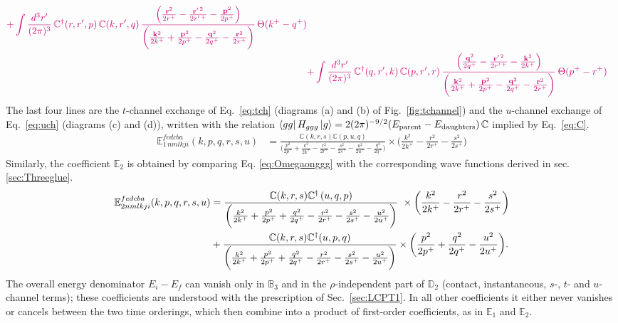 \documentclass[a4paper,11pt]{article}
\def\v#1{\mathbf{#1}}
\def\mf#1{\mathbb{#1}}
\begin{document}
\begin{align}
{\color{chg}+\int\frac{d^{3}r^{\prime}}{(2\pi)^{3}}\,\mf{C}^{\dagger}(r,r^{\prime},p)\,\mf{C}(k,r^{\prime},q)\,\frac{\left(\frac{\v{r}^{2}}{2r^{+}}-\frac{\v{r}^{\prime\,2}}{2r^{\prime\,+}}-\frac{\v{p}^{2}}{2p^{+}}\right)}{\bigg(\frac{\v{k}^{2}}{2k^{+}}+\frac{\v{p}^{2}}{2p^{+}}-\frac{\v{q}^{2}}{2q^{+}}-\frac{\v{r}^{2}}{2r^{+}}\bigg)}\,\Theta(k^{+}-q^{+})}\notag \\ & {\color{chg}+\int\frac{d^{3}r^{\prime}}{(2\pi)^{3}}\,\mf{C}^{\dagger}(q,r^{\prime},k)\,\mf{C}(p,r^{\prime},r)\,\frac{\left(\frac{\v{q}^{2}}{2q^{+}}-\frac{\v{r}^{\prime\,2}}{2r^{\prime\,+}}-\frac{\v{k}^{2}}{2k^{+}}\right)}{\bigg(\frac{\v{k}^{2}}{2k^{+}}+\frac{\v{p}^{2}}{2p^{+}}-\frac{\v{q}^{2}}{2q^{+}}-\frac{\v{r}^{2}}{2r^{+}}\bigg)}\,\Theta(p^{+}-r^{+})}
\end{align}
{\color{chg}The last four lines are the $t$-channel exchange of Eq.~\eqref{eq:tch} (diagrams (a) and (b) of Fig.~\ref{fig:tchannel}) and the $u$-channel exchange of Eq.~\eqref{eq:uch} (diagrams (c) and (d)), written with the relation $\bra{gg}H_{ggg}\ket{g}=2(2\pi)^{-9/2}(E_{\text{parent}}-E_{\text{daughters}})\,\mf{C}$ implied by Eq.~\eqref{eq:C}.}
\begin{align}
    \mf{E}^{fedcba}_{1\,nmlkji}(k,p,q,r,s,u) & =  \frac{\mf{C}(k,r,s)\mf{C}(p,u,q)}{\bigg(\frac{p^{2}}{2p^{+}}+\frac{k^{2}}{2k^{+}}-\frac{r^{2}}{2r^{+}}-\frac{s^{2}}{2s^{+}}-\frac{u^{2}}{2u^{+}}-\frac{q^{2}}{2q^{+}}\bigg)} \times \bigg(\frac{k^{2}}{2k^{+}}-\frac{r^{2}}{2r^{+}}-\frac{s^{2}}{2s^{+}}\bigg)
\end{align}
Similarly, the coefficient $\mf{E}_{2}$ is obtained by comparing Eq. \eqref{eq:Omegaonggg} with the corresponding wave functions derived in sec. \ref{sec:Threeglue}.
\begin{align}
    \mf{E}^{fedcba}_{2nmlkji}(k,p,q,r,s,u) & =  \frac{\mf{C}(k,r,s) \mf{C}^{\dagger\,}(u,q,p)}{\bigg(\frac{k^{2}}{2k^{+}}+\frac{p^{2}}{2p^{+}}+\frac{q^{2}}{2q^{+}}-\frac{r^{2}}{2r^{+}}-\frac{s^{2}}{2s^{+}}-\frac{u^{2}}{2u^{+}}\bigg)}\ \times \bigg(\frac{k^{2}}{2k^{+}}-\frac{r^{2}}{2r^{+}}-\frac{s^{2}}{2s^{+}}\bigg) \notag \\ & + \frac{\mf{C}(k,r,s)\mf{C}^{\dagger}(u,p,q)}{\bigg(\frac{k^{2}}{2k^{+}}+\frac{p^{2}}{2p^{+}}+\frac{q^{2}}{2q^{+}}-\frac{r^{2}}{2r^{+}}-\frac{s^{2}}{2s^{+}}-\frac{u^{2}}{2u^{+}}\bigg)} \times \bigg(\frac{p^{2}}{2p^{+}}+\frac{q^{2}}{2q^{+}}-\frac{u^{2}}{2u^{+}}\bigg).
\end{align}
{\color{chg}The overall energy denominator $E_{i}-E_{f}$ can vanish only in $\mf{B}_{3}$ and in the $\rho$-independent part of $\mf{D}_{2}$ (contact, instantaneous, $s$-, $t$- and $u$-channel terms); these coefficients are understood with the prescription of Sec.~\ref{sec:LCPT1}. In all other coefficients it either never vanishes or cancels between the two time orderings, which then combine into a product of first-order coefficients, as in $\mf{E}_{1}$ and $\mf{E}_{2}$.}
\end{document}
